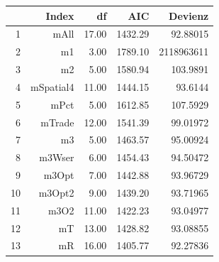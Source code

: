 \begin{table}[ht]
\centering
\begin{tabular}{rrrrr}
  \hline
 & Index & df & AIC & Devienz\\ 
  \hline
  1 & mAll & 17.00 & 1432.29 & 92.88015 \\ 
  2 & m1 & 3.00 & 1789.10 &  2118963611\\ 
  3 & m2 & 5.00 & 1580.94 &  103.9891\\ 
  4 & mSpatial4 & 11.00 & 1444.15 &  93.6144\\ 
  5 & mPct & 5.00 & 1612.85 &  107.5929\\ 
  6 & mTrade & 12.00 & 1541.39 &  99.01972\\ 
  7 & m3 & 5.00 & 1463.57 &  95.00924\\ 
  8 & m3Wser & 6.00 & 1454.43 &  94.50472\\ 
  9 & m3Opt & 7.00 & 1442.88 & 93.96729 \\ 
  10 & m3Opt2 & 9.00 & 1439.20 & 93.71965 \\ 
  11 & m3O2 & 11.00 & 1422.23 & 93.04977 \\ 
  12 & mT & 13.00 & 1428.82 & 93.08855 \\ 
  13 & mR & 16.00 & 1405.77 & 92.27836 \\ 
   \hline
\end{tabular}
\label{tab:assdc}
\end{table}

